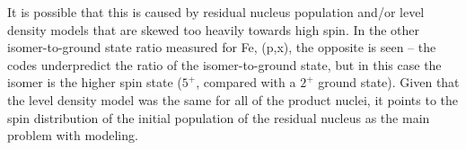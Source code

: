 It is possible that this is caused by residual nucleus population and/or level density models that are skewed too heavily towards high spin.
In the other isomer-to-ground state ratio measured for Fe,  (p,x), the opposite is seen -- the codes underpredict the ratio of the isomer-to-ground state, but in this case the isomer is the higher spin state ($5^+$, compared with a  $2^+$ ground state).
Given that the level density model was the same for all of the product nuclei, it points to the spin distribution of the initial population of the residual nucleus as the main problem with modeling.


% 
% 
% 
% 
% 


